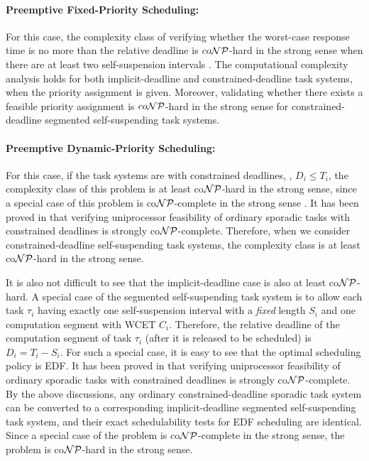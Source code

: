 
\paragraph{Preemptive Fixed-Priority Scheduling:}   
For this case, the complexity class of verifying whether the worst-case response time is no more than the relative deadline is $co{\cal NP}$-hard in the strong sense when there are at least two self-suspension intervals \cite{RTSS2016-suspension}. The computational complexity analysis holds for both implicit-deadline and constrained-deadline task systems, when the priority assignment is given.  Moreover, validating whether there exists a feasible priority assignment is $co{\cal NP}$-hard in the strong sense for constrained-deadline segmented self-suspending task systems.

\paragraph{Preemptive Dynamic-Priority Scheduling:} 
For this case, if the task systems are with constrained deadlines, \ie, $D_i \leq T_i$, the complexity class of this problem is at least co${\cal NP}$-hard in the strong sense, since a special case of this problem is co${\cal NP}$-complete in the strong sense \cite{DBLP:conf/ecrts/Ekberg015}. It has been proved in \cite{DBLP:conf/ecrts/Ekberg015} that verifying uniprocessor feasibility of ordinary sporadic tasks with constrained deadlines is strongly co${\cal NP}$-complete.  Therefore, when we consider constrained-deadline self-suspending task systems, the complexity class is at least co${\cal NP}$-hard in the strong sense.

It is also not difficult to see that the implicit-deadline case is also at least co${\cal NP}$-hard.  A special case of the segmented self-suspending task system is to allow each task $\tau_i$ having exactly one self-suspension interval with a \emph{fixed} length $S_i$ and one computation segment with WCET $C_i$.  Therefore, the relative deadline of the computation segment of task $\tau_i$ (after it is released to be scheduled) is $D_i = T_i-S_i$. For such a special case, it is easy to see that the optimal scheduling policy is EDF. 
It has been proved in \cite{DBLP:conf/ecrts/Ekberg015} that verifying uniprocessor feasibility of ordinary sporadic tasks with constrained deadlines is strongly co${\cal NP}$-complete.
By the above discussions, any ordinary constrained-deadline sporadic task system can be converted to a corresponding implicit-deadline segmented self-suspending task system, and their exact schedulability tests for EDF scheduling are identical. Since a special case of the problem is co${\cal NP}$-complete in the strong sense, the problem is co${\cal NP}$-hard in the strong sense.


